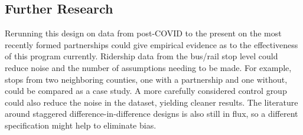 \documentclass [12pt]{report}
\begin{document}
\subsection*{Further Research}
Rerunning this design on data from post-COVID to the present on the most recently formed partnerships could give empirical evidence as to the effectiveness of this program currently. Ridership data from the bus/rail stop level could reduce noise and the number of assumptions needing to be made. For example, stops from two neighboring counties, one with a partnership and one without, could be compared as a case study. A more carefully considered control group could also reduce the noise in the dataset, yielding cleaner results. The literature around staggered difference-in-difference designs is also still in flux, so a different specification might help to eliminate bias.

\newpage
{}
\printbibliography
\end{document}
